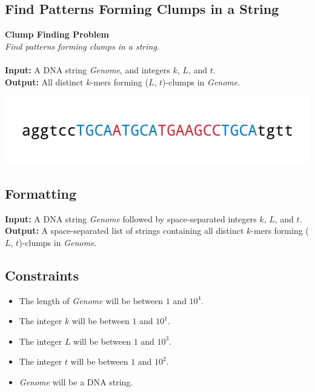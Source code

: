 \documentclass{article}
\begin{document}
\subsection{Find Patterns Forming Clumps in a String}
\hline\vspace{5}
\noindent \textbf{Clump Finding Problem}\\
\emph{Find patterns forming clumps in a string}.\\ \\
\textbf{Input:} A DNA string \emph{Genome}, and integers $k$, $L$, and $t$.\\
\textbf{Output:} All distinct $k$-mers forming ($L$, $t$)-clumps in \emph{Genome}.
\begin{center}
    \includegraphics[scale=0.2]{c1/logos/1E.png} 
\end{center}
\hline\vspace{5}

\subsection*{Formatting}
\textbf{Input:} A DNA string \emph{Genome} followed by space-separated integers $k$, $L$, and $t$.\\
\noindent \textbf{Output:} A space-separated list of strings containing all distinct $k$-mers forming ($L$, $t$)-clumps in \emph{Genome}.

\subsection*{Constraints}
\begin{itemize}
    \item The length of \emph{Genome} will be between $1$ and $10^4$.
    \item The integer $k$ will be between $1$ and $10^1$.
    \item The integer $L$ will be between $1$ and $10^3$.
    \item The integer $t$ will be between $1$ and $10^2$.
    \item \emph{Genome} will be a DNA string.
\end{itemize}
\pagebreak
\end{document}
